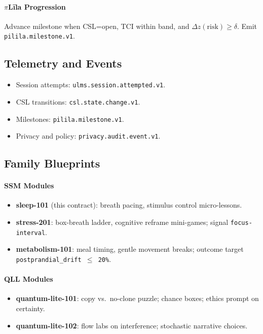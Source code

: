 \documentclass[11pt]{article}
\theoremstyle{plain}
\begin{document}
\paragraph{$\pi$Līla Progression}
Advance milestone when CSL=open, TCI within band, and $\Delta z(\text{risk})\ge\delta$. Emit \texttt{pilila.milestone.v1}.

\subsection{Telemetry and Events}
\begin{itemize}
  \item Session attempts: \texttt{ulms.session.attempted.v1}.
  \item CSL transitions: \texttt{csl.state.change.v1}.
  \item Milestones: \texttt{pilila.milestone.v1}.
  \item Privacy and policy: \texttt{privacy.audit.event.v1}.
\end{itemize}

\subsection{Family Blueprints}
\paragraph{SSM Modules}
\begin{itemize}
  \item \textbf{sleep-101} (this contract): breath pacing, stimulus control micro-lessons.
  \item \textbf{stress-201}: box-breath ladder, cognitive reframe mini-games; signal \texttt{focus-interval}.
  \item \textbf{metabolism-101}: meal timing, gentle movement breaks; outcome target \texttt{postprandial\_drift $\le$ 20\%}.
\end{itemize}

\paragraph{QLL Modules}
\begin{itemize}
  \item \textbf{quantum-lite-101}: copy vs.\ no-clone puzzle; chance boxes; ethics prompt on certainty.
  \item \textbf{quantum-lite-102}: flow labs on interference; stochastic narrative choices.
\end{itemize}
\end{document}
